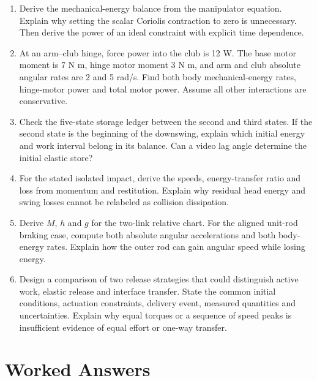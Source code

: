 \begin{enumerate}
\item Derive the mechanical-energy balance from the manipulator equation.
Explain why setting the scalar Coriolis contraction to zero is unnecessary.
Then derive the power of an ideal constraint with explicit time dependence.
\item At an arm--club hinge, force power into the club is 12 W. The base motor
moment is 7 N m, hinge motor moment 3 N m, and arm and club absolute angular
rates are 2 and 5 rad/s. Find both body mechanical-energy rates, hinge-motor
power and total motor power. Assume all other interactions are conservative.
\item Check the five-state storage ledger between the second and third states.
If the second state is the beginning of the downswing, explain which initial
energy and work interval belong in its balance. Can a video lag angle determine
the initial elastic store?
\item For the stated isolated impact, derive the speeds, energy-transfer ratio
and loss from momentum and restitution. Explain why residual head energy and
swing losses cannot be relabeled as collision dissipation.
\item Derive $M$, $h$ and $g$ for the two-link relative chart. For the aligned
unit-rod braking case, compute both absolute angular accelerations and both
body-energy rates. Explain how the outer rod can gain angular speed while
losing energy.
\item Design a comparison of two release strategies that could distinguish
active work, elastic release and interface transfer. State the common initial
conditions, actuation constraints, delivery event, measured quantities and
uncertainties. Explain why equal torques or a sequence of speed peaks is
insufficient evidence of equal effort or one-way transfer.
\end{enumerate}

\section{Worked Answers}

